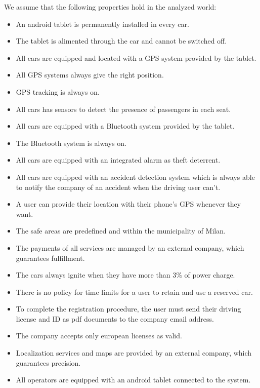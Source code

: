 We assume that the following properties hold in the analyzed world:			
			
			\begin{itemize}
				\item An android tablet is permanently installed in every car. 
				\item The tablet is alimented through the car and cannot be switched off.
				\item All cars are equipped and located with a GPS system provided by the tablet.
				\item All GPS systems always give the right position.
				\item GPS tracking is always on.
				\item All cars has sensors to detect the presence of passengers in each seat.
				\item All cars are equipped with a Bluetooth system provided by the tablet.
				\item The Bluetooth system is always on.
				\item All cars are equipped with an integrated alarm as theft deterrent. %
				\item All cars are equipped with an accident detection system which is always able to notify the company of an accident when the driving user can't. 
				\item A user can provide their location with their phone's GPS whenever they want. 
				\item The safe areas are predefined and within the municipality of Milan.
				\item The payments of all services are managed by an external company, which guarantees fulfillment.
				\item The cars always ignite when they have more than 3\% of power charge.
				\item There is no policy for time limits for a user to retain and use a reserved car. %
				\item To complete the registration procedure, the user must send their driving license and ID as pdf documents to the company email address.
				\item The company accepts only european licenses as valid.
				\item Localization services and maps are provided by an external company, which guarantees precision. 
				\item All operators are equipped with an android tablet connected to the system.
			\end{itemize}
